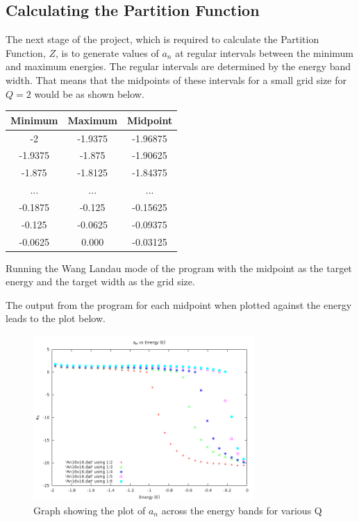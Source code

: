\subsection{Calculating the Partition Function}
The next stage of the project, which is required to calculate the Partition Function, $Z$, is to generate values of $a_n$ at regular intervals between the minimum and maximum energies.
The regular intervals are determined by the energy band width. That means that the midpoints of these intervals for a small grid size for $Q=2$ would be as shown below.
\begin{table}[h]
\centering
\begin{tabular}{|c|c|c|}
\hline
Minimum & Maximum & Midpoint \\ \hline
-2      & -1.9375 & -1.96875 \\ \hline
-1.9375 & -1.875  & -1.90625 \\ \hline
-1.875  & -1.8125 & -1.84375 \\ \hline
...     & ...     & ...      \\ \hline
-0.1875 & -0.125  & -0.15625 \\ \hline
-0.125  & -0.0625 & -0.09375 \\ \hline
-0.0625 & 0.000   & -0.03125 \\ \hline
\end{tabular}
\end{table}

Running the Wang Landau mode of the program with the midpoint as the target energy and the target width as the grid size.

The output from the program for each midpoint when plotted against the energy leads to the plot below.
\begin{figure}[H]
\centering
\includegraphics[width=0.75\textwidth]{4-Results/a_n.png}
\caption{Graph showing the plot of $a_n$ across the energy bands for various Q}
\end{figure}

